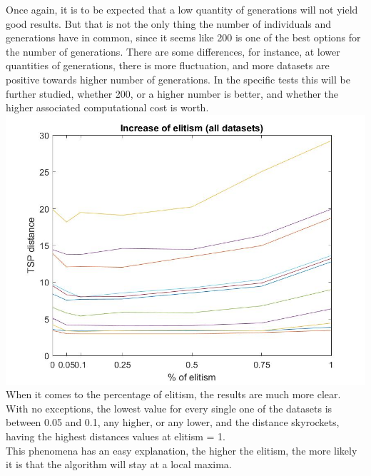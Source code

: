 Once again, it is to be expected that a low quantity of generations will not
yield good results. But that is not the only thing the number of
individuals and generations have in common, since it seems like 200 is one of
the best options for the number of generations. There are some
differences, for instance, at lower quantities of generations, there is more
fluctuation, and more datasets are positive towards higher number of
generations. In the specific tests this will be further studied, whether
200, or a higher number is better, and whether the higher
associated computational cost is worth.
 \\

\includegraphics[width=\textwidth]{img/xalt_edges/elitism.jpg}\\
When it comes to the percentage of elitism, the results are much more clear.
With no exceptions, the lowest value for every single one of the datasets
is between 0.05 and 0.1, any higher, or any lower, and the distance
skyrockets, having the highest distances values at elitism = 1. \\
This phenomena has an easy explanation, the higher the elitism, the more likely it is that the
algorithm will stay at a local maxima. \\



